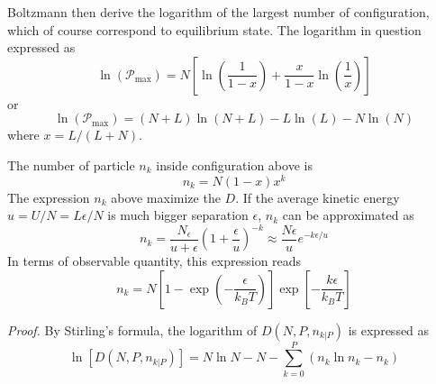 \documentclass[../../../Main.tex]{subfiles}
\begin{document}
Boltzmann then derive the logarithm of the largest number of configuration, which of course correspond to equilibrium state. The logarithm in question expressed as 
\begin{equation*}
    \ln(\mathcal{P}_\text{max})=N\left[\ln \left(\frac{1}{1-x}\right)+\frac{x}{1-x}\ln \left(\frac{1}{x}\right)\right]
\end{equation*}
or
\begin{equation*}
    \ln(\mathcal{P}_\text{max})= (N+L)\ln (N+L) - L\ln (L)-N\ln (N)
\end{equation*}
where $x=L/(L+N)$. 

The number of particle $n_k$ inside configuration above is 
\begin{equation*}
    n_k=N(1-x)x^k
\end{equation*}
The expression $n_k$ above maximize the $D$. If the average kinetic energy $u=U/N=L\epsilon/N$ is much bigger separation $\epsilon$, $n_k$ can be approximated as 
\begin{equation*}
    n_k=\frac{N_\epsilon}{u+\epsilon}\left(1+\frac{\epsilon}{u}\right)^{-k}\approx\frac{N\epsilon}{u}e^{-k\epsilon/u}
\end{equation*}
In terms of observable quantity, this expression reads 
\begin{equation*}
    n_k=N\left[1-\exp\left(-\frac{\epsilon}{k_BT}\right)\right]\exp\left[-\frac{k\epsilon}{k_BT}\right]
\end{equation*}

\emph{Proof.} By Stirling’s formula, the logarithm of $D(N , P, n_{k|P} )$ is expressed as
\begin{equation*}
    \ln\left[D(N , P, n_{k|P} )\right]=N\ln N-N-\sum_{k=0}^{P}\left(n_k\ln n_k-n_k\right)
\end{equation*}
\end{document}
